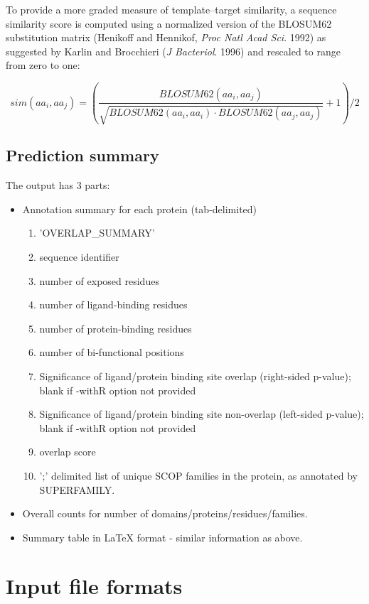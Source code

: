 \documentclass[11pt]{article}
\begin{document}
To provide a more graded measure of template--target similarity, a sequence similarity score is computed using a normalized version of the BLOSUM62 substitution matrix (Henikoff and Hennikof, {\it Proc Natl Acad Sci}. 1992) as suggested by Karlin and Brocchieri ({\it J Bacteriol}. 1996) and rescaled to range from zero to one:

\begin{equation}
sim(aa_i,aa_j) = (\frac{BLOSUM62(aa_i,aa_j)}{\sqrt{BLOSUM62(aa_i, aa_i) \cdot BLOSUM62(aa_j, aa_j)}} + 1) / 2
\end{equation}


\subsection{Prediction summary}
The output has 3 parts:
\begin{itemize}
   \item Annotation summary for each protein (tab-delimited)
   \begin{enumerate}
      \item 'OVERLAP\_SUMMARY'
      \item sequence identifier
      \item number of exposed residues
      \item number of ligand-binding residues
      \item number of protein-binding residues
      \item number of bi-functional positions
      \item Significance of ligand/protein binding site overlap (right-sided p-value); blank if -withR option not provided
      \item Significance of ligand/protein binding site non-overlap (left-sided p-value); blank if -withR option not provided
      \item overlap score
      \item ';' delimited list of unique SCOP families in the protein, as annotated by SUPERFAMILY.
   \end{enumerate}
   \item Overall counts for number of domains/proteins/residues/families.
   \item Summary table in LaTeX format - similar information as above.
\end{itemize}

\section{Input file formats}
\end{document}
